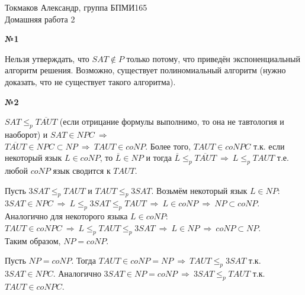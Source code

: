 \documentclass{article}
\newenvironment{task}{\begin{center}\fontsize{14}{14}\selectfont\bf}{\rm\fontsize{12}{12}\selectfont\end{center}}
\newcommand{\rimpl}{\ \Rightarrow \ }
\begin{document}
	\begin{center}
		Токмаков Александр, группа БПМИ165 \\
		Домашняя работа 2
	\end{center}

	
	\begin{task} 
		№1
	\end{task}

	Нельзя утверждать, что $SAT \not\in P$ только потому, что приведён экспоненциальный алгоритм решения. Возможно, существует полиномиальный алгоритм (нужно доказать, что не существует такого алгоритма).
	
	
		
	\begin{task} 
		№2
	\end{task}

	
	$SAT \leq_p \overline{TAUT}$ (если отрицание формулы выполнимо, то она не тавтология и наоборот) и $SAT \in NPC \ \Rightarrow\ $ \\ $\overline{TAUT} \in NPC \subset NP \ \Rightarrow\ TAUT \in coNP$. Более того, $TAUT \in coNPC$ т.к. если некоторый язык $L \in coNP$, то $\overline{L} \in NP$ и тогда $\overline{L} \leq_p \overline{TAUT} \ \Rightarrow \ L \leq_p TAUT$ т.е. любой $coNP$ язык сводится к $TAUT$. 
	
	Пусть $3SAT \leq_p TAUT$ и $TAUT \leq_p 3SAT$. Возьмём некоторый язык $L \in NP$: \\ $3SAT \in NPC \rimpl L \leq_p 3SAT \leq_p TAUT \rimpl L \in coNP \rimpl NP \subset coNP$.\\ Аналогично для некоторого языка $L \in coNP$: \\ $TAUT \in coNPC \rimpl L \leq_p TAUT \leq_p 3SAT \rimpl L \in NP \rimpl coNP \subset NP$. \\
	Таким образом, $NP = coNP$.
	
	Пусть $NP = coNP$. Тогда $TAUT \in coNP = NP \rimpl TAUT \leq_p 3SAT$ т.к. $3SAT \in NPC$. Аналогично $3SAT \in NP = coNP \rimpl 3SAT \leq_p TAUT$ т.к. $TAUT \in coNPC$. 

	
\end{document}

